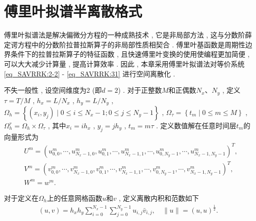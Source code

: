 \section{傅里叶拟谱半离散格式}\label{Section_SAVRRK: 3}
傅里叶拟谱法是解决偏微分方程的一种成熟技术 , 它是非局部方法 , 
这与分数阶薛定谔方程中的分数阶拉普拉斯算子的非局部性质相契合 . 
傅里叶基函数是周期性边界条件下的拉普拉斯算子的特征函数 , 且快速傅里叶变换的使用使编程更加简便 , 可以大大减少计算量 , 提高计算效率 . 
因此 , 本章采用傅里叶拟谱法对等价系统 \eqref{eq_SAVRRK:2-2} - \eqref{eq_SAVRRK:31} 进行空间离散化 . 

不失一般性 , 设空间维度为2 (即$d=2$) . 对于正整数$M$和正偶数$N_{x}$、$N_{y}$ , 定义$\tau={T}/{M}$ , $h_{x}={L}/{N_{x}}$ , $h_{y}={L}/{N_{y}}$ , 
$\Omega_{h}=\left\{(x_{i} , y_{j}) \mid 0 \leq i \leq N_x-1;0 \leq j \leq N_y-1\right\}$ , $\Omega_{\tau}=\left\{t_{m} \mid 0 \leq m \leq M\right\}$ , $\Omega_{h}^{\tau}=\Omega_{h} \times \Omega_{\tau}$ , 
其中$x_{i}=i h_{x}$ , $y_{j}=j h_{y}$ , $t_{m}=m \tau$ . 
定义数值解在任意时间层$t_m$的向量形式为
\begin{align}\label{eq_SAVRRK:47}
&U^m=\left(u_{0 , 0}^m , \cdots , u_{N_{x}-1 , 0}^m , u_{0 , 1}^m , \cdots , u_{N_{x}-1 , 1}^m , \cdots , u_{0 , N_{y}-1}^m , \cdots , u_{N_{x}-1 , N_{y}-1}^m\right)^{T} , \\
&V^m=\left(v_{0 , 0}^m , \cdots , v_{N_{x}-1 , 0}^m , v_{0 , 1}^m , \cdots , v_{N_{x}-1 , 1}^m , \cdots , v_{0 , N_{y}-1}^m , \cdots , v_{N_{x}-1 , N_{y}-1}^m\right)^{T} , \\
&W^m=w^m . 
\end{align}

对于定义在$\Omega_{h}$上的任意网格函数$u$和$v$ , 定义离散内积和范数如下
\begin{align}\label{eq_SAVRRK:48}
(u , v)=h_{x} h_{y} \sum_{i=0}^{N_{x}-1} \sum_{j=0}^{N_{y}-1} u_{i , j} \bar{v}_{i , j} , \quad\|u\|=(u , u)^{\frac{1}{2}} . %
\end{align}

